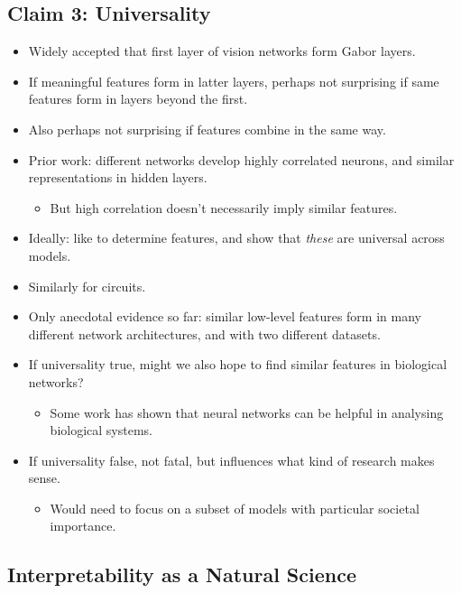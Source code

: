 \subsection{Claim 3: Universality}

\begin{itemize}
    \item Widely accepted that first layer of vision networks form Gabor layers.
    \item If meaningful features form in latter layers, perhaps not surprising if same features form in layers beyond the first.
    \item Also perhaps not surprising if features combine in the same way.
    \item Prior work: different networks develop highly correlated neurons, and similar representations in hidden layers.
    \begin{itemize}
        \item But high correlation doesn't necessarily imply similar features.
    \end{itemize}
    \item Ideally: like to determine features, and show that \emph{these} are universal across models.
    \item Similarly for circuits.
    \item Only anecdotal evidence so far: similar low-level features form in many different network architectures, and with two different datasets.
    \item If universality true, might we also hope to find similar features in biological networks?
    \begin{itemize}
        \item Some work has shown that neural networks can be helpful in analysing biological systems.
    \end{itemize}
    \item If universality false, not fatal, but influences what kind of research makes sense.
    \begin{itemize}
        \item Would need to focus on a subset of models with particular societal importance.
    \end{itemize}
\end{itemize}


\subsection{Interpretability as a Natural Science}

